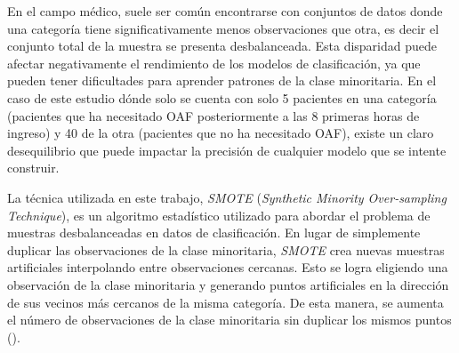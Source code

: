 En el campo médico, suele ser común encontrarse con conjuntos de datos donde una categoría tiene significativamente menos observaciones que otra, es decir el conjunto total de la muestra se presenta desbalanceada. Esta disparidad puede afectar negativamente el rendimiento de los modelos de clasificación, ya que pueden tener dificultades para aprender patrones de la clase minoritaria. En el caso de este estudio dónde solo se cuenta con solo 5 pacientes en una categoría (pacientes que ha necesitado OAF posteriormente a las $8$ primeras horas de ingreso) y 40  de la  otra (pacientes que no ha necesitado OAF), existe un claro desequilibrio que puede impactar la precisión de cualquier modelo que se intente construir.

La técnica utilizada en este trabajo, \textit{SMOTE} (\textit{Synthetic Minority Over-sampling Technique}), es un algoritmo estadístico utilizado para abordar el problema de muestras desbalanceadas en datos de clasificación. En lugar de simplemente duplicar las observaciones de la clase minoritaria, \textit{SMOTE} crea nuevas muestras artificiales interpolando entre observaciones cercanas. Esto se logra eligiendo una observación de la clase minoritaria y generando puntos artificiales en la dirección de sus vecinos más cercanos de la misma categoría. De esta manera, se aumenta el número de observaciones de la clase minoritaria sin duplicar los mismos puntos (\cite{Chawla2002}).
\newpage


\newpage



\newpage